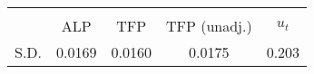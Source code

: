 \begin{tabular}{l*{1}{cccc}}
\toprule
                &\multicolumn{4}{c}{}                   \\
                &  ALP&  TFP&TFP (unadj.)&$ u_t $\\
\midrule
S.D.              &   0.0169&   0.0160&   0.0175&    0.203\\
\bottomrule
\end{tabular}
